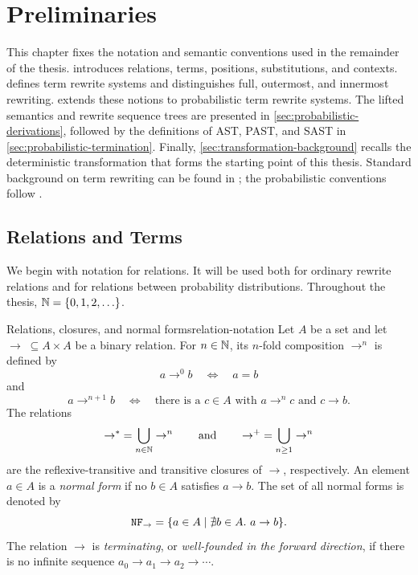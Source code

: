 \chapter{Preliminaries}\label{chap:preliminaries}

This chapter fixes the notation and semantic conventions used in the remainder
of the thesis.   introduces relations, terms,
positions, substitutions, and contexts.   defines term
rewrite systems and distinguishes full, outermost, and innermost rewriting.
 extends these notions to probabilistic term rewrite systems.
The lifted semantics and rewrite sequence trees are presented in
\cref{sec:probabilistic-derivations}, followed by the definitions of AST, PAST,
and SAST in \cref{sec:probabilistic-termination}.  Finally,
\cref{sec:transformation-background} recalls the deterministic transformation
that forms the starting point of this thesis.  Standard background on term
rewriting can be found in \cite{baader_nipkow_1999}; the probabilistic
conventions follow \cite{avanzini_dallago_yamada_2020,kassing_giesl_2025}.

\section{Relations and Terms}\label{sec:relations-terms}

We begin with notation for relations.  It will be used both for ordinary
rewrite relations and for relations between probability distributions.
Throughout the thesis, $\mathbb{N}=\{0,1,2,\ldots\}$.

\begin{Definition}{Relations, closures, and normal forms}{relation-notation}
  Let $A$ be a set and let $\to\;\subseteq A\times A$ be a binary relation.
  For $n\in\mathbb{N}$, its $n$-fold composition $\to^n$ is defined by
  \[
    a\to^0 b \quad\Longleftrightarrow\quad a=b
  \]
  and
  \[
    a\to^{n+1}b
    \quad\Longleftrightarrow\quad
    \text{there is a }c\in A\text{ with }a\to^n c\text{ and }c\to b.
  \]
  The relations
  \[
    \to^*\;=\bigcup_{n\in\mathbb{N}}\to^n
    \qquad\text{and}\qquad
    \to^+\;=\bigcup_{n\geq 1}\to^n
  \]
  are the reflexive-transitive and transitive closures of $\to$,
  respectively.  An element $a\in A$ is a \emph{normal form} if no $b\in A$
  satisfies $a\to b$.  The set of all normal forms is denoted by
  \[
    \mathtt{NF}_{\to}=\{a\in A\mid \nexists b\in A.\ a\to b\}.
  \]
  The relation $\to$ is \emph{terminating}, or \emph{well-founded in the
  forward direction}, if there is no infinite sequence
  $a_0\to a_1\to a_2\to\cdots$.
\end{Definition}

